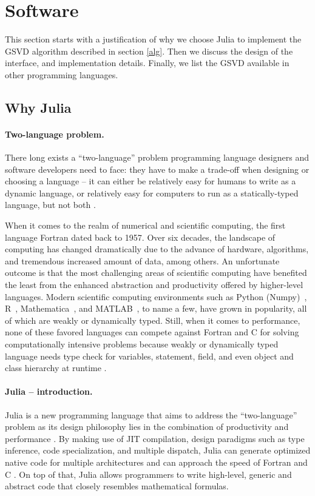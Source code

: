 \section{Software} \label{sec:software} 

This section starts with a justification of why we choose Julia to 
implement the GSVD algorithm described in section \ref{alg}. 
Then we discuss the design of the interface, and implementation details. 
Finally, we list the GSVD available in other 
programming languages. 

\subsection{Why Julia}

\paragraph{Two-language problem.}
There long exists a ``two-language'' problem programming language designers 
and software developers need to face: they have to make a trade-off 
when designing or choosing a language -- it can either be relatively 
easy for humans to write as a dynamic language, or relatively easy for 
computers to run as a statically-typed language, 
but not both \cite{perkel2019julia}.

When it comes to the realm of numerical and scientific computing, 
the first language Fortran \cite{10.5555/541529} dated back to 1957. Over six decades, 
the landscape of computing has changed dramatically due to the 
advance of hardware, algorithms, and tremendous increased amount of data, 
among others. An unfortunate outcome is that the most challenging areas 
of scientific computing have benefited the least from the enhanced 
abstraction and productivity offered by higher-level languages. 
Modern scientific computing environments such as 
Python (Numpy)~\cite{van2011numpy}, 
R~\cite{ihaka1996r}, 
Mathematica~\cite{math}, and 
MATLAB~\cite{MATLAB}, to name a few, 
have grown in popularity, all of which are weakly or dynamically typed. 
Still, when it comes to performance, none of these favored languages 
can compete against Fortran and C for solving computationally intensive problems
because weakly or dynamically typed language needs type check for variables, statement, field,
and even object and class hierarchy at runtime \cite{bezanson2017julia}. 

\paragraph{Julia -- introduction.} 
Julia is a new programming language that aims to address 
the ``two-language'' problem as its design philosophy lies in the combination of productivity 
and performance \cite{bezanson2017julia} \cite{edelman2019julia}.
By making use of JIT compilation, design paradigms such as
type inference, code specialization, and multiple dispatch,
Julia can generate optimized native 
code for multiple architectures and can approach the speed of Fortran and C \cite{Sengupta2019}. 
On top of that, Julia allows programmers to write high-level, generic and 
abstract code that closely resembles mathematical formulas. 

